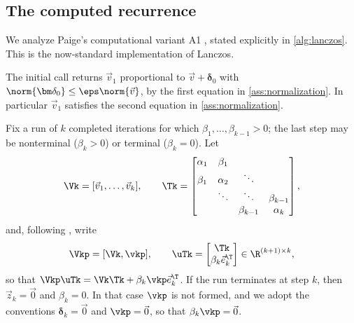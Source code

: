 \subsection{The computed recurrence}

We analyze Paige's computational variant A1 \cite{paige1976}, stated explicitly in \cref{alg:lanczos}. 
This is the now-standard implementation of Lanczos.

\begin{remark}
The initial call returns \(\vec v_1\) proportional to \(\vec v+\bm\delta_0\) with \(\norm{\bm\delta_0}\le\eps\norm{\vec v}\), by the first equation in \cref{ass:normalization}.
In particular \(\vec v_1\) satisfies the second equation in \cref{ass:normalization}.
\end{remark}

Fix a run of \(k\) completed iterations for which \(\beta_1,\ldots,\beta_{k-1}>0\); the last step may be nonterminal (\(\beta_k>0\)) or terminal (\(\beta_k=0\)).
Let
\[
 \Vk=[\vec v_1,\ldots,\vec v_k],
 \qquad
 \Tk=
 \begin{bmatrix}
  \alpha_1&\beta_1&&\\
  \beta_1&\alpha_2&\ddots&\\
  &\ddots&\ddots&\beta_{k-1}\\
  &&\beta_{k-1}&\alpha_k
 \end{bmatrix},
\]
and, following \cite{saad2011}, write
\[
 \Vkp=[\Vk,\vkp],
 \qquad
 \uTk=
 \begin{bmatrix}
  \Tk\\
  \beta_k\vec e_k^\T
 \end{bmatrix}
 \in\R^{(k+1)\times k},
\]
so that \(\Vkp\uTk=\Vk\Tk+\beta_k\vkp\vec e_k^\T\).
If the run terminates at step \(k\), then \(\vec z_k=\vec0\) and \(\beta_k=0\).
In that case \(\vkp\) is not formed, and we adopt the conventions \(\bm\delta_k=\vec0\) and \(\vkp=\vec0\), so that \(\beta_k\vkp=\vec0\).

